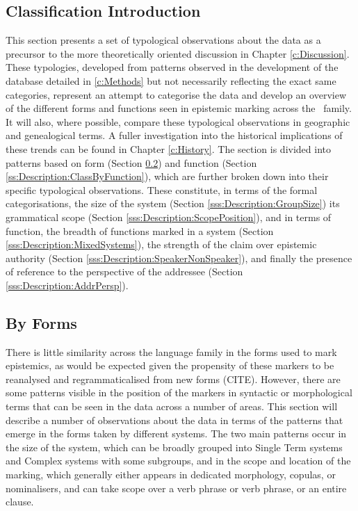 \subsection{Classification Introduction}
This section presents a set of typological observations about the data as a precursor to the more theoretically oriented discussion in Chapter \ref{c:Discussion}. These typologies, developed from patterns observed in the development of the database detailed in \cref{c:Methods} but not necessarily reflecting the exact same categories, represent an attempt to categorise the data and develop an overview of the different forms and functions seen in epistemic marking across the \lfam\ family. It will also, where possible, compare these typological observations in geographic and genealogical terms. A fuller investigation into the historical implications of these trends can be found in Chapter \ref{c:History}. The section is divided into patterns based on form (Section \ref{ss:Description:ClassBySystem}) and function (Section \ref{ss:Description:ClassByFunction}), which are further broken down into their specific typological observations. These constitute, in terms of the formal categorisations, the size of the system (Section \ref{sss:Description:GroupSize}) its grammatical scope (Section \ref{sss:Description:ScopePosition}), and in terms of function, the breadth of functions marked in a system (Section \ref{sss:Description:MixedSystems}), the strength of the claim over epistemic authority (Section \ref{sss:Description:SpeakerNonSpeaker}), and finally the presence of reference to the perspective of the addressee (Section \ref{sss:Description:AddrPersp}).
\subsection{By Forms}\label{ss:Description:ClassBySystem}
There is little similarity across the language family in the forms used to mark epistemics, as would be expected given the propensity of these markers to be reanalysed and regrammaticalised from new forms (CITE). However, there are some patterns visible in the position of the markers in syntactic or morphological terms that can be seen in the data across a number of areas. This section will describe a number of observations about the data in terms of the patterns that emerge in the forms taken by different systems. The two main patterns occur in the size of the system, which can be broadly grouped into Single Term systems and Complex systems with some subgroups, and in the scope and location of the marking, which generally either appears in dedicated morphology, copulas, or nominalisers, and can take scope over a verb phrase or verb phrase, or an entire clause.
